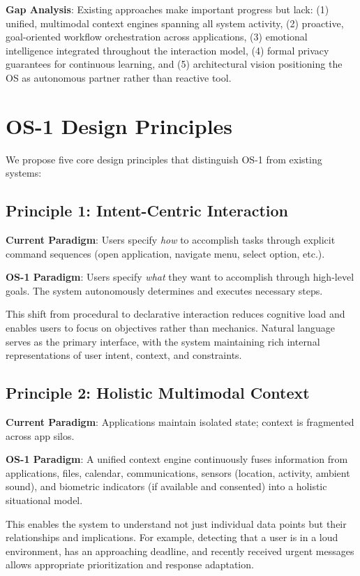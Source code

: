 \documentclass[conference]{IEEEtran}
\begin{document}
\textbf{Gap Analysis}: Existing approaches make important progress but lack: (1) unified, multimodal context engines spanning all system activity, (2) proactive, goal-oriented workflow orchestration across applications, (3) emotional intelligence integrated throughout the interaction model, (4) formal privacy guarantees for continuous learning, and (5) architectural vision positioning the OS as autonomous partner rather than reactive tool.

\section{OS-1 Design Principles}

We propose five core design principles that distinguish OS-1 from existing systems:

\subsection{Principle 1: Intent-Centric Interaction}

\textbf{Current Paradigm}: Users specify \textit{how} to accomplish tasks through explicit command sequences (open application, navigate menu, select option, etc.).

\textbf{OS-1 Paradigm}: Users specify \textit{what} they want to accomplish through high-level goals. The system autonomously determines and executes necessary steps.

This shift from procedural to declarative interaction reduces cognitive load and enables users to focus on objectives rather than mechanics. Natural language serves as the primary interface, with the system maintaining rich internal representations of user intent, context, and constraints.

\subsection{Principle 2: Holistic Multimodal Context}

\textbf{Current Paradigm}: Applications maintain isolated state; context is fragmented across app silos.

\textbf{OS-1 Paradigm}: A unified context engine continuously fuses information from applications, files, calendar, communications, sensors (location, activity, ambient sound), and biometric indicators (if available and consented) into a holistic situational model.

This enables the system to understand not just individual data points but their relationships and implications. For example, detecting that a user is in a loud environment, has an approaching deadline, and recently received urgent messages allows appropriate prioritization and response adaptation.
\end{document}
